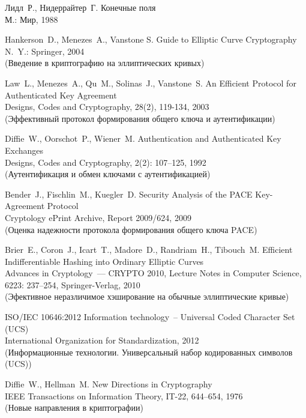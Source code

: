 \clearpage
\begin{thebibliography}{999}
Лидл~Р., Нидеррайтер~Г. Конечные поля\\
{\small М.: Мир, 1988}

Hankerson~D., Menezes~A., Vanstone S.
Guide to Elliptic Curve Cryptography\\
{\small N.~Y.: Springer, 2004}\\
{\small (Введение в криптографию на эллиптических кривых)}

Law~L., Menezes~A., Qu~M., Solinas~J., Vanstone~S.
An Efficient Protocol for Authenticated Key Agreement\\
{\small Designs, Codes and Cryptography, 28(2), 119-134, 2003}\\
{\small (Эффективный протокол формирования общего ключа и аутентификации)}

Diffie~W., Oorschot~P., Wiener~M. 
Authentication and Authenticated Key Exchanges\\
{\small Designs, Codes and Cryptography, 2(2): 107--125, 1992}\\
{\small (Аутентификация и обмен ключами с аутентификацией)}

Bender~J., Fischlin~M., Kuegler~D. 
Security Analysis of the PACE Key-Agreement Protocol\\
{\small Cryptology ePrint Archive, Report 2009/624, 2009}\\
{\small (Оценка надежности протокола формирования общего ключа PACE)}

Brier~E., Coron~J., Icart~T., Madore~D., Randriam~H., Tibouch~M. 
Efficient Indifferentiable Hashing into Ordinary Elliptic Curves\\
{\small Advances in Cryptology~--– CRYPTO 2010, 
Lecture Notes in Computer Science, 6223: 237--254, Springer-Verlag, 
2010}\\
%
{\small (Эфективное неразличимое хэширование на обычные эллиптические 
кривые)}

ISO/IEC 10646:2012
Information technology~-- Universal Coded Character Set (UCS)\\
{\small International Organization for Standardization, 2012}\\
{\small (Информационные технологии. 
Универсальный набор кодированных символов (UCS))}

Diffie~W., Hellman~M. 
New Directions in Cryptography\\
{\small IEEE Transactions on Information Theory, IT-22, 644–654, 1976}\\
{\small (Новые направления в криптографии)}

\label{LastBib}
\end{thebibliography}



